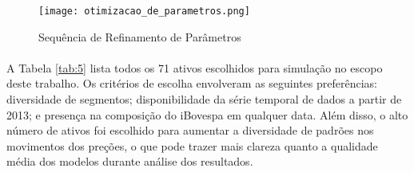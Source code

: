 \begin{figure}[!htb]
    \texttt{[image: otimizacao\_de\_parametros.png]}
    \centering
    \caption{Sequência de Refinamento de Parâmetros}
    \label{fig:444}
\end{figure}

\paragraph{} A Tabela \ref{tab:5} lista todos os 71 ativos escolhidos para simulação no escopo deste trabalho. Os critérios de escolha envolveram as seguintes preferências: diversidade de segmentos; disponibilidade da série temporal de dados a partir de 2013; e presença na composição do iBovespa em qualquer data. Além disso, o alto número de ativos foi escolhido para aumentar a diversidade de padrões nos movimentos dos preções, o que pode trazer mais clareza quanto a qualidade média dos modelos durante análise dos resultados.

